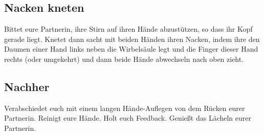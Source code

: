 \subsection{Nacken kneten}

Bittet eure Partnerin, ihre Stirn auf ihren Hände abzustützen, so dass ihr Kopf gerade liegt. Knetet dann sacht mit beiden Händen ihren Nacken, indem ihre den Daumen einer Hand links neben die Wirbelsäule legt und die Finger dieser Hand rechts (oder umgekehrt) und dann beide Hände abwechseln nach oben zieht.


\subsection{Nachher}

Verabschiedet euch mit einem langen Hände-Auflegen von dem Rücken eurer Partnerin. Reinigt eure Hände. Holt euch Feedback. Genießt das Lächeln eurer Partnerin.
